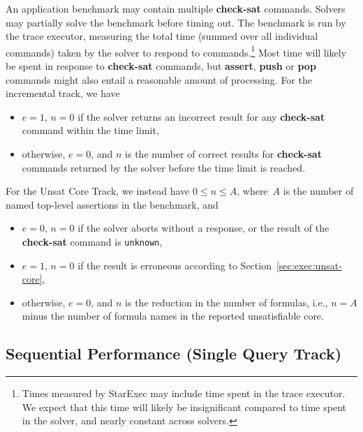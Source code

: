 \documentclass[12pt]{article}
\newcommand{\akey}[1]{\textbf{#1}}
\newcommand{\main}{Single Query\xspace}
\newcommand{\ucore}{Unsat Core\xspace}
\begin{document}
%
An application benchmark may contain multiple \akey{check-sat}
commands.  Solvers may partially solve the benchmark before timing
out.  The benchmark is run by the trace executor, measuring the total
time (summed over all individual commands) taken by the solver to
respond to commands.\footnote{Times measured by StarExec may include
  time spent in the trace executor.  We expect that this time will
  likely be insignificant compared to time spent in the solver, and
  nearly constant across solvers.}  Most time will likely be spent in
response to \akey{check-sat} commands, but \akey{assert}, \akey{push}
or \akey{pop} commands might also entail a reasonable amount of
processing.  For the incremental track, we have
\begin{itemize}
\item $e=1$, $n=0$ if the solver returns an incorrect result for any
  \akey{check-sat} command within the time limit,
\item otherwise, $e=0$, and $n$ is the number of correct results for
  \akey{check-sat} commands returned by the solver before the time
  limit is reached.
\end{itemize}

\header{\ucore Track.}
%
For the \ucore Track, we instead have $0 \leq n \leq A$, where~$A$
is the number of named top-level assertions in the benchmark, and
\begin{itemize}
\item $e=0$, $n=0$ if the solver aborts without a response, or the
  result of the \akey{check-sat} command is \texttt{unknown},
\item $e=1$, $n=0$ if the result is erroneous according to
  Section~\ref{sec:exec:unsat-core},
\item otherwise, $e=0$, and $n$ is the reduction in the number of
  formulas, i.e., $n = A$ minus the number of formula names in the
  reported unsatisfiable core.
\end{itemize}

\subsection{Sequential Performance (\main Track)}
\label{sec:sequential}


\iffalse
SMT-COMP has traditionally emphasized sequential performance (i.e.,
CPU time) over parallel performance (i.e., wall-clock time).  StarExec
measures both, and we intend to recognize both best sequential and
best parallel solvers in all competitive \main Track divisions.
\fi
\end{document}
